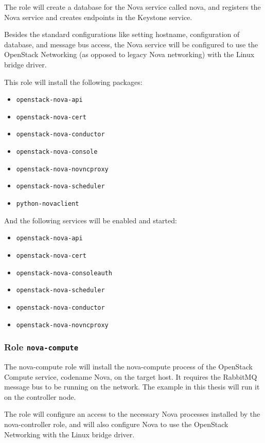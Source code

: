 The role will create a database for the Nova service called nova, and registers the Nova service and creates endpoints in the Keystone service.

Besides the standard configurations like setting hostname, configuration of database, and message bus access, the Nova service will be configured to use the OpenStack Networking (as opposed to legacy Nova networking) with the Linux bridge driver.

This role will install the following packages:
\begin{itemize}
  \item{\texttt{openstack-nova-api}}
  \item{\texttt{openstack-nova-cert}}
  \item{\texttt{openstack-nova-conductor}}
  \item{\texttt{openstack-nova-console}}
  \item{\texttt{openstack-nova-novncproxy}}
  \item{\texttt{openstack-nova-scheduler}}
  \item{\texttt{python-novaclient}}
\end{itemize}
And the following services will be enabled and started:
\begin{itemize}
  \item{\texttt{openstack-nova-api}}
  \item{\texttt{openstack-nova-cert}}
  \item{\texttt{openstack-nova-consoleauth}}
  \item{\texttt{openstack-nova-scheduler}}
  \item{\texttt{openstack-nova-conductor}}
  \item{\texttt{openstack-nova-novncproxy}}
\end{itemize}

\subsubsection*{Role \texttt{nova-compute}}
The nova-compute role will install the nova-compute process of the OpenStack Compute service, codename Nova, on the target host. It requires the RabbitMQ message bus to be running on the network. The example in this thesis will run it on the controller node.

The role will configure an access to the necessary Nova processes installed by the nova-controller role, and will also configure Nova to use the OpenStack Networking with the Linux bridge driver.

